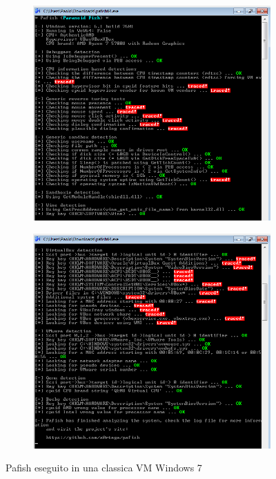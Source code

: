 \begin{figure}[htbp]
\centering
\begin{subfigure}{.5\textwidth}
  \centering
  \includegraphics[width=\linewidth]{assets/pafish_standard_vm_1.png}
\end{subfigure}%
\begin{subfigure}{.5\textwidth}
  \centering
  \includegraphics[width=\linewidth]{assets/pafish_standard_vm_2.png}
\end{subfigure}
\caption{Pafish eseguito in una classica VM Windows 7}
\label{fig:pafish_standard_vm}
\end{figure}

